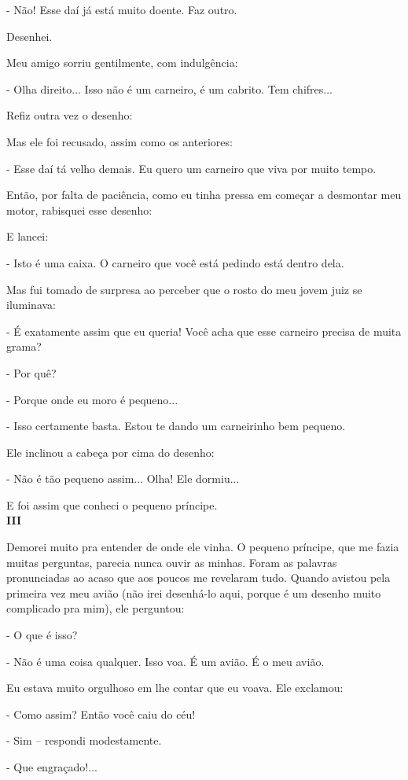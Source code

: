 \begin{Parallel}[p]{}{}
{- Não! Esse daí já está muito doente. Faz outro.

Desenhei.

Meu amigo sorriu gentilmente, com indulgência:

- Olha direito... Isso não é um carneiro, é um cabrito. Tem chifres...

Refiz outra vez o desenho:

Mas ele foi recusado, assim como os anteriores:

- Esse daí tá velho demais. Eu quero um carneiro que viva por muito
tempo.

Então, por falta de paciência, como eu tinha pressa em começar a
desmontar meu motor, rabisquei esse desenho:

E lancei:

- Isto é uma caixa. O carneiro que você está pedindo está dentro dela.

Mas fui tomado de surpresa ao perceber que o rosto do meu jovem juiz se
iluminava:

- É exatamente assim que eu queria! Você acha que esse carneiro precisa
de muita grama?

- Por quê?

- Porque onde eu moro é pequeno...

- Isso certamente basta. Estou te dando um carneirinho bem pequeno.

Ele inclinou a cabeça por cima do desenho:

- Não é tão pequeno assim... Olha! Ele dormiu...

E foi assim que conheci o pequeno príncipe.\\

\textbf{III}

Demorei muito pra entender de onde ele vinha. O pequeno príncipe, que me
fazia muitas perguntas, parecia nunca ouvir as minhas. Foram as palavras
pronunciadas ao acaso que aos poucos me revelaram tudo. Quando avistou
pela primeira vez meu avião (não irei desenhá-lo aqui, porque é um
desenho muito complicado pra mim), ele perguntou:

- O que é isso?

- Não é uma coisa qualquer. Isso voa. É um avião. É o meu avião.

Eu estava muito orgulhoso em lhe contar que eu voava. Ele exclamou:

- Como assim? Então você caiu do céu!

- Sim -- respondi modestamente.

- Que engraçado!...

}
\end{Parallel}
